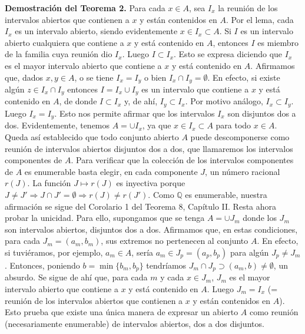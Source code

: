 \documentclass[12pt,oneside]{book}
\begin{document}
\textbf{Demostración del Teorema 2.} Para cada \(x \in A\), sea \(I_x\) la reunión de los intervalos abiertos que contienen a \(x\) y están contenidos en \(A\). Por el lema, cada \(I_x\) es un intervalo abierto, siendo evidentemente \(x \in I_x \subset A\). Si \(I\) es un intervalo abierto cualquiera que contiene a \(x\) y está contenido en \(A\), entonces \(I\) es miembro de la familia cuya reunión dio \(I_x\). Luego \(I \subset I_x\). Esto se expresa diciendo que \(I_x\) es el mayor intervalo abierto que contiene a \(x\) y está contenido en \(A\). Afirmamos que, dados \(x, y \in A\), o se tiene \(I_x = I_y\) o bien \(I_x \cap I_y = \emptyset\). En efecto, si existe algún \(z \in I_x \cap I_y\) entonces \(I = I_x \cup I_y\) es un intervalo que contiene a \(x\) y está contenido en \(A\), de donde \(I \subset I_x\) y, de ahí, \(I_y \subset I_x\). Por motivo análogo, \(I_x \subset I_y\). Luego \(I_x = I_y\). Esto nos permite afirmar que los intervalos \(I_x\) son disjuntos dos a dos. Evidentemente, tenemos \(A = \cup I_x\), ya que \(x \in I_x \subset A\) para todo \(x \in A\). Queda así establecido que todo conjunto abierto \(A\) puede descomponerse como reunión de intervalos abiertos disjuntos dos a dos, que llamaremos los intervalos componentes de \(A\). Para verificar que la colección de los intervalos componentes de \(A\) es enumerable basta elegir, en cada componente \(J\), un número racional \(r(J)\). La función \(J \mapsto r(J)\) es inyectiva porque \(J \neq J' \Rightarrow J \cap J' = \emptyset \Rightarrow r(J) \neq r(J')\). Como \(\mathbb{Q}\) es enumerable, nuestra afirmación se sigue del Corolario 1 del Teorema 8, Capítulo II. Resta ahora probar la unicidad. Para ello, supongamos que se tenga \(A = \cup J_m\) donde los \(J_m\) son intervalos abiertos, disjuntos dos a dos. Afirmamos que, en estas condiciones, para cada \(J_m = (a_m, b_m)\), sus extremos no pertenecen al conjunto \(A\). En efecto, si tuviéramos, por ejemplo, \(a_m \in A\), sería \(a_m \in J_p = (a_p, b_p)\) para algún \(J_p \neq J_m\). Entonces, poniendo \(b = \min\{b_m, b_p\}\) tendríamos \(J_m \cap J_p \supset (a_m, b) \neq \emptyset\), un absurdo. Se sigue de ahí que, para cada \(m\) y cada \(x \in J_m\), \(J_m\) es el mayor intervalo abierto que contiene a \(x\) y está contenido en \(A\). Luego \(J_m = I_x\) (= reunión de los intervalos abiertos que contienen a \(x\) y están contenidos en \(A\)). Esto prueba que existe una única manera de expresar un abierto \(A\) como reunión (necesariamente enumerable) de intervalos abiertos, dos a dos disjuntos.
\end{document}
